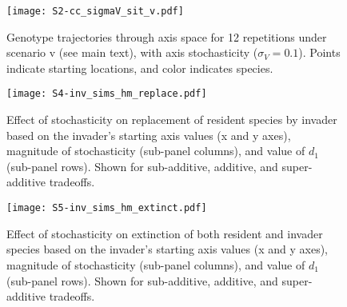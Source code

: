 \begin{figure}[ht!]
\centering
\texttt{[image: S2-cc\_sigmaV\_sit\_v.pdf]}
\caption{Genotype trajectories through axis space for 12 repetitions under 
scenario v (see main text), with axis stochasticity ($\sigma_V = 0.1$).
Points indicate starting locations, and color indicates species.}
\label{fig:cond-coexist-Vstoch-sit-v}
\end{figure}



\begin{figure}[ht!]
\centering
\texttt{[image: S4-inv\_sims\_hm\_replace.pdf]}
\caption{Effect of stochasticity on replacement of resident species by invader
    based on the invader's starting axis values (x and y axes),
    magnitude of stochasticity (sub-panel columns), and 
    value of $d_1$ (sub-panel rows).
    Shown for sub-additive, additive, and super-additive tradeoffs.}
\label{fig:inv-sims-heatmap-replace}
\end{figure}

\begin{figure}[ht!]
\centering
\texttt{[image: S5-inv\_sims\_hm\_extinct.pdf]}
\caption{Effect of stochasticity on extinction of both resident and invader
    species based on the invader's starting axis values (x and y axes),
    magnitude of stochasticity (sub-panel columns), and 
    value of $d_1$ (sub-panel rows).
    Shown for sub-additive, additive, and super-additive tradeoffs.}
\label{fig:inv-sims-heatmap-extinct}
\end{figure}

